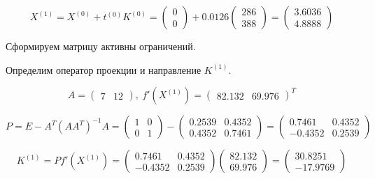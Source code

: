 \begin{equation*}
X^{(1)} = X^{(0)} + t^{(0)} K^{(0)} = \begin{pmatrix} 0 \\ 0 \end{pmatrix} + 0.0126 \begin{pmatrix} 286 \\ 388 \end{pmatrix} = \begin{pmatrix} 3.6036 \\ 4.8888 \end{pmatrix}
\end{equation*}

Сформируем матрицу активны ограничений.

Определим оператор проекции и направление $K^{(1)}$.

\begin{equation*}
A = \begin{pmatrix} 7 & 12 \end{pmatrix},\ 
f'(X^{(1)}) = \begin{pmatrix} 82.132 & 69.976 \end{pmatrix}^T
\end{equation*}

\begin{equation*}
P = E - A^T \left(A A^T\right)^{-1} A = \begin{pmatrix} 1 & 0 \\ 0 & 1 \end{pmatrix} - \begin{pmatrix} 0.2539 & 0.4352 \\ 0.4352 & 0.7461 \end{pmatrix} = \begin{pmatrix} 0.7461 & 0.4352 \\ -0.4352 & 0.2539 \end{pmatrix}
\end{equation*}

\begin{equation*}
K^{(1)} = P f'(X^{(1)}) = \begin{pmatrix} 0.7461 & 0.4352 \\ -0.4352 & 0.2539 \end{pmatrix} \begin{pmatrix} 82.132 \\ 69.976 \end{pmatrix} = \begin{pmatrix} 30.8251 \\ -17.9769 \end{pmatrix}
\end{equation*}

